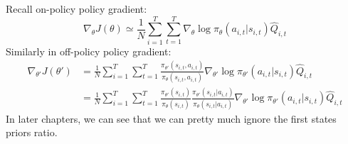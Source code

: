 Recall on-policy policy gradient:
$$\nabla_{\theta}J(\theta) \simeq \frac{1}{N} \sum_{i=1}^T \sum_{t=1}^T\nabla_\theta \log \pi_\theta(a_{i,t}|s_{i,t})\hat{Q}_{i,t}$$
Similarly in off-policy policy gradient:
\begin{align*}
    \nabla_{\theta'}J(\theta') &= \frac{1}{N} \sum_{i=1}^T \sum_{t=1}^T   \frac{\pi_{\theta'}(s_{i,t},a_{i,t})}{\pi_{\theta}(s_{i,t},a_{i,t})}\nabla_{\theta'} \log \pi_{\theta'}(a_{i,t}|s_{i,t})\hat{Q}_{i,t}\\
    &= \frac{1}{N} \sum_{i=1}^T \sum_{t=1}^T \frac{\pi_{\theta'}(s_{i,t})}{\pi_{\theta}(s_{i,t})}\frac{\pi_{\theta'}(s_{i,t}|a_{i,t})}{\pi_{\theta}(s_{i,t}|a_{i,t})}\nabla_{\theta'} \log \pi_{\theta'}(a_{i,t}|s_{i,t})\hat{Q}_{i,t}
\end{align*}
In later chapters, we can see that we can pretty much ignore the first states priors ratio.